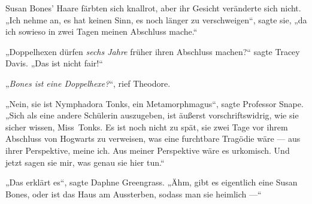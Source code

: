Susan Bones’ Haare färbten sich knallrot, aber ihr Gesicht veränderte sich nicht.
„Ich nehme an, es hat keinen Sinn, es noch länger zu verschweigen“, sagte sie, „da ich sowieso in zwei Tagen meinen Abschluss mache.“

„Doppelhexen dürfen \emph{sechs Jahre} früher ihren Abschluss machen?“ sagte Tracey Davis.
„Das ist nicht fair!“

„\emph{Bones ist eine Doppelhexe?}“, rief Theodore.

„Nein, sie ist Nymphadora Tonks, ein Metamorphmagus“, sagte Professor Snape.
„Sich als eine andere Schülerin auszugeben, ist äußerst vorschriftswidrig, wie sie sicher wissen, Miss~Tonks. Es ist noch nicht zu spät, sie zwei Tage vor ihrem Abschluss von Hogwarts zu verweisen, was eine furchtbare Tragödie wäre — aus ihrer Perspektive, meine ich. Aus meiner Perspektive wäre es urkomisch. Und jetzt sagen sie mir, was genau sie hier tun.“

„Das erklärt es“, sagte Daphne Greengrass.
„Ähm, gibt es eigentlich eine Susan Bones, oder ist das Haus am Aussterben, sodass man sie heimlich —“

